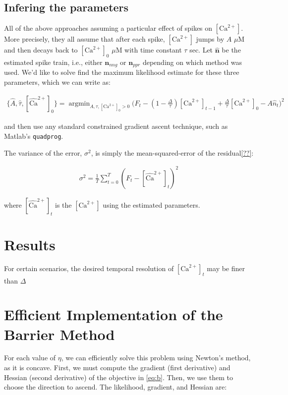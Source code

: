 \documentclass[12pt]{article}
\providecommand{\ve}[1]{\boldsymbol{#1}}
\providecommand{\ve}[1]{\boldsymbol{#1}}
\DeclareMathOperator*{\argmin}{argmin}
\newcommand{\Ca}{[\text{Ca}^{2+}]}
\newcommand{\Cae}{[\widehat{\text{Ca}}^{2+}]}
\newcommand{\Ae}{\widehat{A}}
\newcommand{\te}{\widehat{\tau}}
\begin{document}
\subsection{Infering the parameters}

All of the above approaches assuming a particular effect of spikes on $\Ca$.  More precisely, they all assume that after each spike, $\Ca$ jumps by $A$ $\mu$M and then decays back to $\Ca_0$ $\mu$M with time constant $\tau$ sec.  Let $\widehat{\ve{n}}$ be the estimated spike train, i.e., either $\ve{n}_{nng}$ or $\ve{n}_{ppr}$ depending on which method was used.  We'd like to solve find the maximum likelihood estimate for these three parameters, which we can write as:

\begin{align}
\{\Ae, \te, \Cae_0\} = \argmin_{A, \tau, \Ca_0>0} \big(F_t - (1-\frac{\Delta}{\tau}) \Ca_{t-1} + \frac{\Delta}{\tau} \Ca_0 - A \widehat{n}_t\big)^2
\end{align}

\noindent and then use any standard constrained gradient ascent technique, such as Matlab's \texttt{quadprog}. 

The variance of the error, $\sigma^2$, is simply the mean-squared-error of the residual\ref{??}:

\begin{align}
\sigma^2 = \frac{1}{T} \sum_{t=0}^T (F_t - \Cae_t)^2
\end{align}

\noindent where $\Cae_t$ is the $\Ca$ using the estimated parameters.

\section{Results} \label{sec:results}

For certain scenarios, the desired temporal resolution of $\Ca_t$ may be finer than $\Delta$

\appendix
\section{Efficient Implementation of the Barrier Method}

For each value of $\eta$, we can efficiently solve this problem using Newton's method, as it is concave.  First, we must compute the gradient (first derivative) and Hessian (second derivative) of the objective  in \eqref{eq:b}. Then, we use them to choose the direction to ascend. The likelihood, gradient, and Hessian are:
\end{document}
